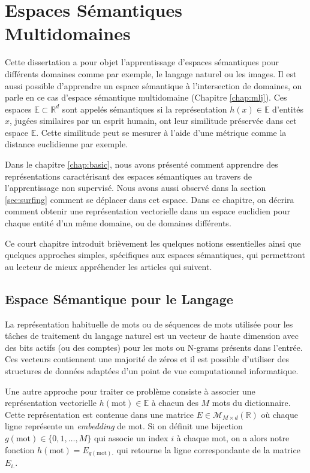 \chapter{Espaces Sémantiques Multidomaines}

Cette dissertation a pour objet l'apprentissage d'espaces sémantiques pour
différents domaines comme par exemple, le langage naturel ou les images. Il est
aussi possible d'apprendre un espace sémantique à l'intersection de domaines,
on parle en ce cas d'espace sémantique multidomaine (Chapitre
\ref{chap:mlj}). Ces espaces $\mathbb{E}\subset \mathbb{R}^{d}$ sont appelés
sémantiques si la représentation $h(x)\in \mathbb{E}$ d'entités $x$, jugées
similaires par un esprit humain, ont leur similitude préservée dans cet espace
$\mathbb{E}$. Cette similitude peut se mesurer à l'aide d'une métrique comme la
distance euclidienne par exemple.

Dans le chapitre \ref{chap:basic}, nous avons présenté comment apprendre des
représentations caractérisant des espaces sémantiques au travers de
l'apprentissage non supervisé. Nous avons aussi observé dans la section
\ref{sec:surfing} comment se déplacer dans cet espace.  Dans ce chapitre, on
décrira comment obtenir une représentation vectorielle dans un espace euclidien
pour chaque entité d'un même domaine, ou de domaines différents.
 
Ce court chapitre introduit brièvement les quelques notions essentielles ainsi
que quelques approches simples, spécifiques aux espaces sémantiques, qui
permettront au lecteur de mieux appréhender les articles qui suivent.
  
\section{Espace Sémantique pour le Langage}

La représentation habituelle de mots ou de séquences de mots utilisée pour les
tâches de traitement du langage naturel est un vecteur de haute dimension avec
des bits actifs (ou des comptes) pour les mots ou N-grams présents dans
l'entrée. Ces vecteurs contiennent une majorité de zéros et il est possible
d'utiliser des structures de données adaptées d'un point de
vue computationnel informatique.

Une autre approche pour traiter ce problème consiste à associer une
représentation vectorielle $h(\textrm{mot})\in\mathbb{E}$ à chacun des $M$ mots
du dictionnaire. Cette représentation est contenue dans une matrice
$E\in\mathcal{M}_{M \times d}(\mathbb{R})$ où chaque ligne représente un {\it
embedding} de mot. Si on définit une bijection $g(\textrm{mot}) \in \lbrace
0,1,\dots, M \rbrace$ qui associe un index $i$ à chaque mot, on a alors notre
fonction $h(\textrm{mot})=E_{g(\textrm{mot}).}$ qui retourne la ligne
correspondante de la matrice $E_{i.}$.

